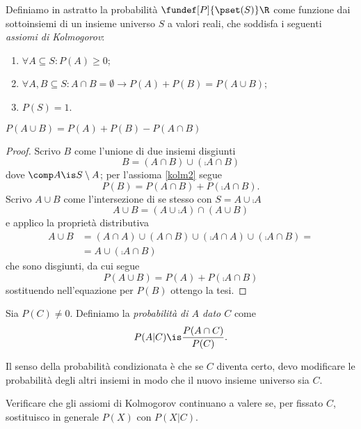 
\begin{defn}[Probabilità]
	Definiamo in astratto la probabilità $\fundef[P]{\pset(S)}\R$ come funzione dai sottoinsiemi di un insieme universo $S$ a valori reali, che soddisfa i seguenti \emph{assiomi di Kolmogorov}:
	\begin{enumerate}
		\item $\forall A\subseteq S:P(A) \ge 0$;
		\item $\forall A,B\subseteq S: A\cap B=\emptyset \rightarrow P(A)+P(B)=P(A\cup B)$; \label{kolm2}
		\item $P(S)=1$.
	\end{enumerate}
\end{defn}

\begin{teo}
	$P(A\cup B) = P(A) + P(B) - P(A\cap B)$
\end{teo}

\begin{proof}
	Scrivo $B$ come l'unione di due insiemi disgiunti
	\[B = (A\cap B) \cup (\comp A \cap B)\]
	dove $\comp A\is S\setminus A$; per l'assioma \ref{kolm2} segue
	\[P(B) = P(A\cap B) + P(\comp A \cap B).\]
	Scrivo $A\cup B$ come l'intersezione di se stesso con $S=A\cup\comp A$
	\[A\cup B = (A\cup\comp A) \cap (A\cup B)\]
	e applico la proprietà distributiva
	\begin{align*}
		A\cup B
		&= (A\cap A) \cup (A\cap B) \cup (\comp A\cap A) \cup (\comp A \cap B) = \\
		&= A \cup (\comp A\cap B)
	\end{align*}
	che sono disgiunti, da cui segue
	\[P(A\cup B) =  P(A) + P(\comp A\cap B)\]
	sostituendo nell'equazione per $P(B)$ ottengo la tesi.
\end{proof}

\begin{defn}
	Sia $P(C)\neq 0$. Definiamo la \emph{probabilità di $A$ dato $C$} come
	\[P(A|C) \is \frac{P(A\cap C)}{P(C)}.\]
\end{defn}

Il senso della probabilità condizionata è che se $C$ diventa certo, devo modificare le probabilità degli altri insiemi in modo che il nuovo insieme universo sia $C$.

\begin{ex}
	Verificare che gli assiomi di Kolmogorov continuano a valere se, per fissato $C$, sostituisco in generale $P(X)$ con $P(X|C)$.
\end{ex}

